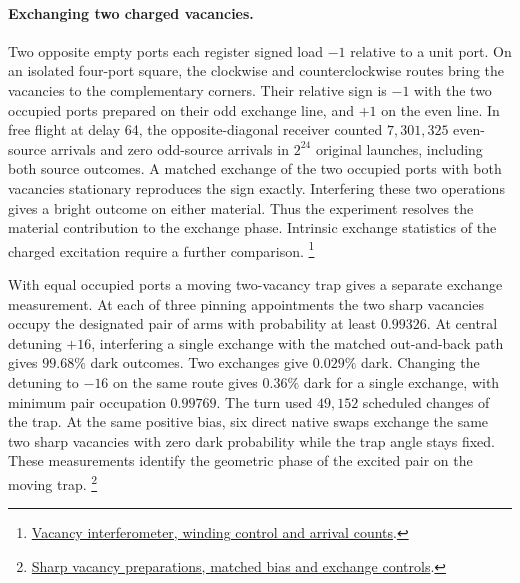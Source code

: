 \documentclass[11pt]{article}
\theoremstyle{definition}
\theoremstyle{remark}
\theoremstyle{plain}
\begin{document}
\paragraph{Exchanging two charged vacancies.}
Two opposite empty ports each register signed load $-1$ relative to
a unit port. On an isolated four-port square, the clockwise and
counterclockwise routes bring the vacancies to the complementary corners.
Their relative sign is $-1$ with the two occupied ports prepared on their
odd exchange line, and $+1$ on the even line. In free flight at delay 64,
the opposite-diagonal receiver counted $7{,}301{,}325$ even-source arrivals
and zero odd-source arrivals in $2^{24}$ original launches, including both
source outcomes. A matched exchange of the two occupied ports with both
vacancies stationary reproduces the sign exactly. Interfering these
two operations gives a bright outcome on either material. Thus the
experiment resolves the material contribution to the exchange phase.
Intrinsic exchange statistics of the charged excitation require a further
comparison.%
\footnote{\href{https://github.com/FloatingPragma/observer-patch-holography/tree/main/model/experiments/interval_echo_angular/charged_orientation/adiabatic_exchange/host_parity/VACANCIES.md}{Vacancy interferometer, winding control and arrival counts}.}

With equal occupied ports a moving two-vacancy trap gives a separate
exchange measurement. At each of three pinning appointments the two
sharp vacancies occupy the designated pair of arms with probability
at least $0.99326$. At central detuning $+16$, interfering a single
exchange with the matched out-and-back path gives $99.68\%$ dark
outcomes. Two exchanges give $0.029\%$ dark. Changing the detuning
to $-16$ on the same route gives $0.36\%$ dark for a single exchange,
with minimum pair occupation $0.99769$. The turn used $49{,}152$
scheduled changes of the trap. At the same positive bias, six direct
native swaps exchange the same two sharp vacancies with zero dark
probability while the trap angle stays fixed. These measurements
identify the geometric phase of the excited pair on the moving trap.%
\footnote{\href{https://github.com/FloatingPragma/observer-patch-holography/tree/main/model/experiments/interval_echo_angular/charged_orientation/adiabatic_exchange/host_parity/excited_motion}{Sharp vacancy preparations, matched bias and exchange controls}.}
\end{document}
